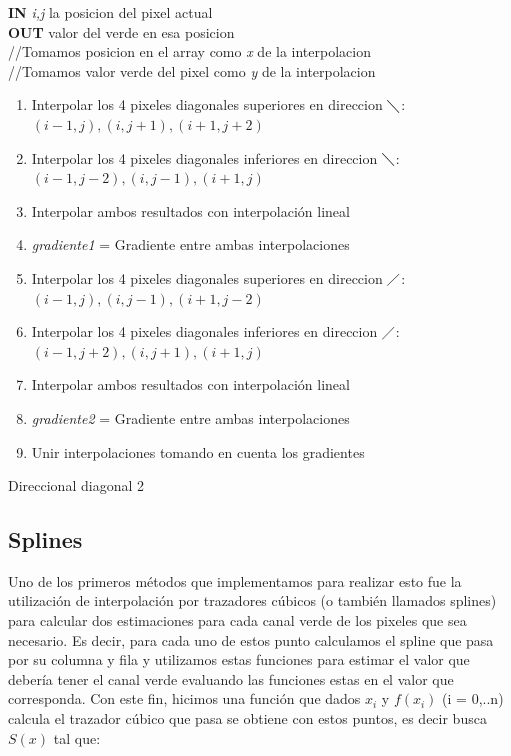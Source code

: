 \documentclass[10pt, a4paper]{article}
\begin{document}
\vspace{0.5cm}
\begin{algorithm}[H]
\textbf{IN} \textit{i,j} la posicion del pixel actual \\
\textbf{OUT} valor del verde en esa posicion\\
//Tomamos posicion en el array como \textit{x} de la interpolacion\\
//Tomamos valor verde del pixel como \textit{y} de la interpolacion\\
\begin{enumerate}[label=\bfseries Step \arabic*:]
\item Interpolar los 4 pixeles diagonales superiores en direccion $\diagdown$: $(i-1,j),(i,j+1),(i+1,j+2)$\\
\item Interpolar los 4 pixeles diagonales inferiores en direccion $\diagdown$: $(i-1,j-2),(i,j-1),(i+1,j)$\\
\item Interpolar ambos resultados con interpolaci\'on lineal\\
\item \textit{gradiente1} = Gradiente entre ambas interpolaciones\\
\item Interpolar los 4 pixeles diagonales superiores en direccion $\diagup$: $(i-1,j),(i,j-1),(i+1,j-2)$
\item Interpolar los 4 pixeles diagonales inferiores en direccion $\diagup$: $(i-1,j+2),(i,j+1),(i+1,j)$
\item Interpolar ambos resultados con interpolaci\'on lineal\\
\item \textit{gradiente2} = Gradiente entre ambas interpolaciones\\
\item Unir interpolaciones tomando en cuenta los gradientes\\
\end{enumerate}
\caption{Direccional diagonal 2}
\end{algorithm}
\vspace{0.5cm}

\subsection{Splines}

Uno de los primeros m\'etodos que implementamos para realizar esto fue la utilizaci\'on de interpolaci\'on por trazadores c\'ubicos (o tambi\'en llamados splines) para calcular dos estimaciones para cada canal verde de los pixeles que sea necesario. Es decir, para cada uno de estos punto calculamos el spline que pasa por su columna y fila y utilizamos estas funciones para estimar el valor que deber\'ia tener el canal verde evaluando las funciones estas en el valor que corresponda.
Con este fin, hicimos una funci\'on que dados $x_{i}$ y $f(x_{i})$ (i = 0,..n) calcula el trazador c\'ubico que pasa se obtiene con estos puntos, es decir busca $S(x)$ tal que:
\end{document}
